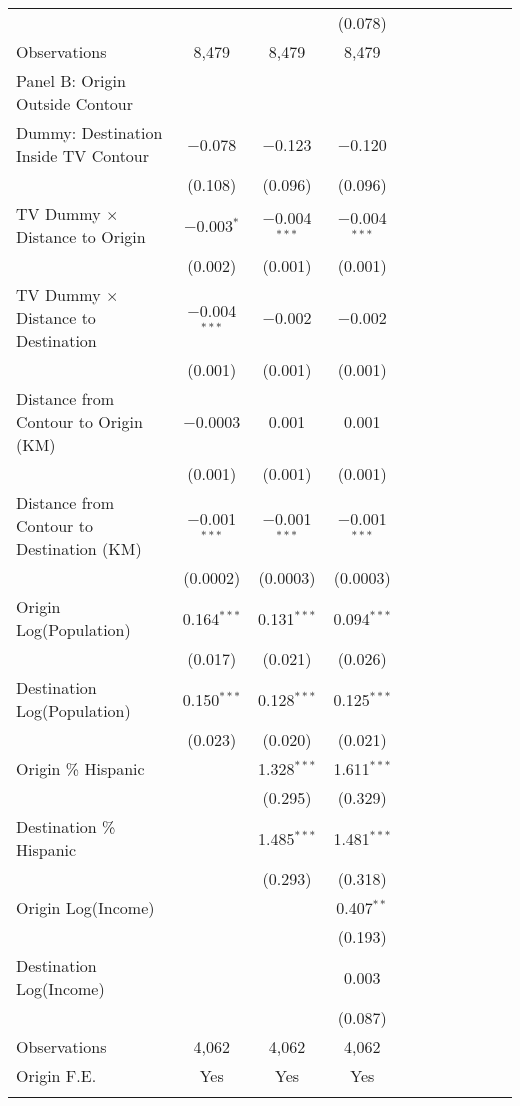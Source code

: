 \begin{table}[!h]
{\begin{threeparttable}
\begin{tabular}{lcccccccccc}
  &  &  & (0.078) \\ 
Observations & 8,479 & 8,479 & 8,479 \\ 
\hline\addlinespace
Panel B: Origin Outside Contour & & & \\ 
\hline\addlinespace
 Dummy: Destination Inside TV Contour & $-$0.078 & $-$0.123 & $-$0.120 \\ 
  & (0.108) & (0.096) & (0.096) \\ 
 TV Dummy $\times$ Distance to Origin & $-$0.003$^{*}$ & $-$0.004$^{***}$ & $-$0.004$^{***}$ \\ 
  & (0.002) & (0.001) & (0.001) \\ 
 TV Dummy $\times$ Distance to Destination & $-$0.004$^{***}$ & $-$0.002 & $-$0.002 \\ 
  & (0.001) & (0.001) & (0.001) \\ 
 Distance from Contour to Origin (KM) & $-$0.0003 & 0.001 & 0.001 \\ 
  & (0.001) & (0.001) & (0.001) \\ 
 Distance from Contour to Destination (KM) & $-$0.001$^{***}$ & $-$0.001$^{***}$ & $-$0.001$^{***}$ \\ 
  & (0.0002) & (0.0003) & (0.0003) \\ 
 Origin Log(Population) & 0.164$^{***}$ & 0.131$^{***}$ & 0.094$^{***}$ \\ 
  & (0.017) & (0.021) & (0.026) \\ 
 Destination Log(Population) & 0.150$^{***}$ & 0.128$^{***}$ & 0.125$^{***}$ \\ 
  & (0.023) & (0.020) & (0.021) \\ 
 Origin \% Hispanic &  & 1.328$^{***}$ & 1.611$^{***}$ \\ 
  &  & (0.295) & (0.329) \\ 
 Destination \% Hispanic &  & 1.485$^{***}$ & 1.481$^{***}$ \\ 
  &  & (0.293) & (0.318) \\ 
 Origin Log(Income) &  &  & 0.407$^{**}$ \\ 
  &  &  & (0.193) \\ 
 Destination Log(Income) &  &  & 0.003 \\ 
  &  &  & (0.087) \\ 
Observations & 4,062 & 4,062 & 4,062 \\         
\hline\addlinespace
                                Origin F.E. & Yes & Yes  & Yes\\
				\addlinespace\hline\hline
			\end{tabular}

\end{threeparttable}}
\end{table}
